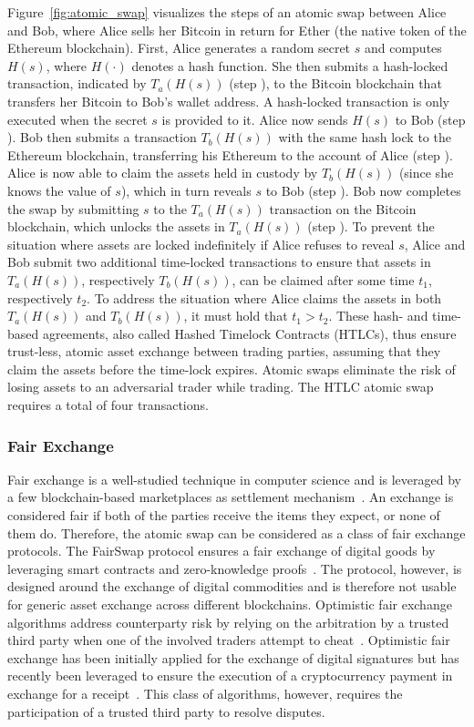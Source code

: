 Figure~\ref{fig:atomic_swap} visualizes the steps of an atomic swap between Alice and Bob, where Alice sells her Bitcoin in return for Ether (the native token of the Ethereum blockchain).
First, Alice generates a random secret $ s $ and computes $ H(s) $, where $ H(\cdot) $ denotes a hash function.
She then submits a hash-locked transaction, indicated by $ T_a(H(s)) $ (step ), to the Bitcoin blockchain that transfers her Bitcoin to Bob's wallet address.
A hash-locked transaction is only executed when the secret $ s $ is provided to it.
Alice now sends $ H(s) $ to Bob (step ).
Bob then submits a transaction $ T_b(H(s)) $ with the same hash lock to the Ethereum blockchain, transferring his Ethereum to the account of Alice (step ).
Alice is now able to claim the assets held in custody by $ T_b(H(s)) $ (since she knows the value of $ s $), which in turn reveals $ s $ to Bob (step ).
Bob now completes the swap by submitting $ s $ to the $ T_a(H(s)) $ transaction on the Bitcoin blockchain, which unlocks the assets in $ T_a(H(s)) $ (step ).
To prevent the situation where assets are locked indefinitely if Alice refuses to reveal $ s $, Alice and Bob submit two additional time-locked transactions to ensure that assets in $ T_a(H(s)) $, respectively $ T_b(H(s)) $, can be claimed after some time $ t_1 $, respectively $ t_2 $.
To address the situation where Alice claims the assets in both $ T_a(H(s)) $ and $ T_b(H(s)) $, it must hold that $ t_1 > t_2 $.
These hash- and time-based agreements, also called Hashed Timelock Contracts (HTLCs), thus ensure trust-less, atomic asset exchange between trading parties, assuming that they claim the assets before the time-lock expires.
Atomic swaps eliminate the risk of losing assets to an adversarial trader while trading.
The HTLC atomic swap requires a total of four transactions.

\subsubsection{Fair Exchange}
Fair exchange is a well-studied technique in computer science and is leveraged by a few blockchain-based marketplaces as settlement mechanism~\cite{pagnia2003fair}.
An exchange is considered fair if both of the parties receive the items they expect, or none of them do.
Therefore, the atomic swap can be considered as a class of fair exchange protocols.
The FairSwap protocol ensures a fair exchange of digital goods by leveraging smart contracts and zero-knowledge proofs~\cite{dziembowski2018fairswap}.
The protocol, however, is designed around the exchange of digital commodities and is therefore not usable for generic asset exchange across different blockchains.
Optimistic fair exchange algorithms address counterparty risk by relying on the arbitration by a trusted third party when one of the involved traders attempt to cheat~\cite{asokan1997optimistic}.
Optimistic fair exchange has been initially applied for the exchange of digital signatures but has recently been leveraged to ensure the execution of a cryptocurrency payment in exchange for a receipt~\cite{liu2018toward}.
This class of algorithms, however, requires the participation of a trusted third party to resolve disputes.

